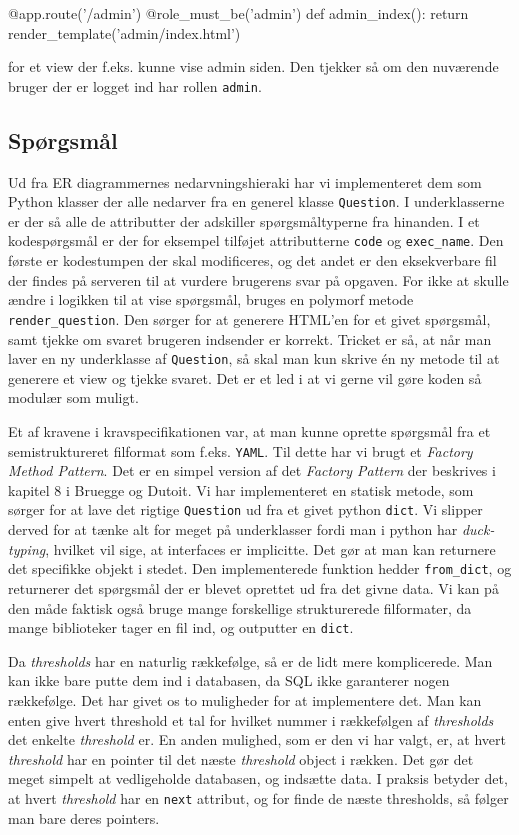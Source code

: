 \documentclass[11pt, a4paper]{article}
\begin{document}
\begin{python}
@app.route('/admin')
@role_must_be('admin')
def admin_index():
    return render_template('admin/index.html')
\end{python}

for et view der f.eks. kunne vise admin siden. Den tjekker så om den nuværende bruger der er logget ind har rollen \verb!admin!.

\subsection{Spørgsmål}
\label{sub:sporgsmal}
Ud fra ER diagrammernes nedarvningshieraki har vi implementeret dem som Python klasser der alle nedarver fra en generel klasse \verb!Question!. I underklasserne er der så alle de attributter der adskiller spørgsmåltyperne fra hinanden. I et kodespørgsmål er der for eksempel tilføjet attributterne \verb!code! og \verb!exec_name!. Den første er kodestumpen der skal modificeres, og det andet er den eksekverbare fil der findes på serveren til at vurdere brugerens svar på opgaven. For ikke at skulle ændre i logikken til at vise spørgsmål, bruges en polymorf metode \verb!render_question!. Den sørger for at generere HTML'en for et givet spørgsmål, samt tjekke om svaret brugeren indsender er korrekt. Tricket er så, at når man laver en ny underklasse af \verb!Question!, så skal man kun skrive én ny metode til at generere et view og tjekke svaret. Det er et led i at vi gerne vil gøre koden så modulær som muligt.

Et af kravene i kravspecifikationen var, at man kunne oprette spørgsmål fra et semistruktureret filformat som f.eks. \verb!YAML!. Til dette har vi brugt et \emph{Factory Method Pattern}. Det er en simpel version af det \emph{Factory Pattern} der beskrives i kapitel 8 i Bruegge og Dutoit\cite{OOSE}. Vi har implementeret en statisk metode, som sørger for at lave det rigtige \verb!Question! ud fra et givet python \verb!dict!. Vi slipper derved for at tænke alt for meget på underklasser fordi man i python har \emph{duck-typing}, hvilket vil sige, at interfaces er implicitte. Det gør at man kan returnere det specifikke objekt i stedet. Den implementerede funktion hedder \verb!from_dict!, og returnerer det spørgsmål der er blevet oprettet ud fra det givne data. Vi kan på den måde faktisk også bruge mange forskellige strukturerede filformater, da mange biblioteker tager en fil ind, og outputter en \verb!dict!.

Da \emph{thresholds} har en naturlig rækkefølge, så er de lidt mere komplicerede. Man kan ikke bare putte dem ind i databasen, da SQL ikke garanterer nogen rækkefølge. Det har givet os to muligheder for at implementere det. Man kan enten give hvert threshold et tal for hvilket nummer i rækkefølgen af \emph{thresholds} det enkelte \emph{threshold} er. En anden mulighed, som er den vi har valgt, er, at hvert \emph{threshold} har en pointer til det næste \emph{threshold} object i rækken. Det gør det meget simpelt at vedligeholde databasen, og indsætte data. I praksis betyder det, at hvert \emph{threshold} har en \verb!next! attribut, og for finde de næste thresholds, så følger man bare deres pointers.
\end{document}
